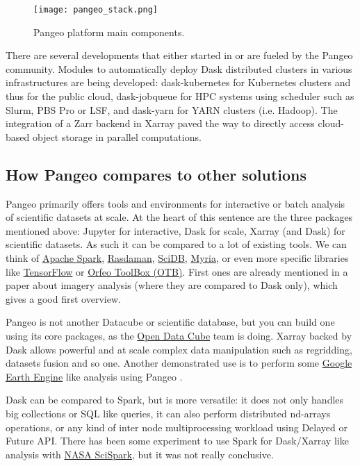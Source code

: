 \documentclass{article}
\begin{document}
\begin{figure}
  \centering
  \texttt{[image: pangeo\_stack.png]}
  \caption{\label{pangeo_stack} Pangeo platform main components.}
\end{figure}

There are several developments that either started in or are fueled by the
Pangeo community. Modules to automatically deploy Dask distributed clusters in various infrastructures are being developed: dask-kubernetes for Kubernetes clusters and thus for the public cloud, dask-jobqueue\cite{b4} for HPC systems using scheduler such as Slurm, PBS Pro or LSF, and dask-yarn for YARN clusters (i.e. Hadoop).
The integration of a Zarr backend in Xarray paved the way to directly access cloud-based object storage in parallel computations.


\subsection{How Pangeo compares to other solutions}
\label{ssec:pangeoadvantages}

Pangeo primarily offers tools and environments for interactive or batch analysis of scientific datasets at scale. 
At the heart of this sentence are the three packages mentioned above: 
Jupyter for interactive, Dask for scale, Xarray (and Dask) for scientific 
datasets.
As such it can be compared to a lot of existing tools. We can think of 
\href{https://spark.apache.org/}{Apache Spark}, \href{http://www.rasdaman.com/}{Rasdaman}, 
\href{https://www.paradigm4.com/try_scidb/}{SciDB}, \href{http://myria.cs.washington.edu/}{Myria},
or even more specific libraries like \href{https://www.tensorflow.org/}{TensorFlow} or 
\href{https://www.orfeo-toolbox.org/}{Orfeo ToolBox (OTB)}. First ones are
already mentioned in a paper about imagery analysis \cite{b4_2} (where they
are compared to Dask only), which gives a good first overview.

Pangeo is not another Datacube or scientific database, but you can
build one using its core packages, as the 
\href{https://www.opendatacube.org}{Open Data Cube} team is doing. Xarray
backed by Dask allows powerful and at scale complex data manipulation such as
regridding, datasets fusion and so one. Another demonstrated use is to perform some 
\href{https://earthengine.google.com/}{Google Earth Engine} like
analysis using Pangeo \cite{b6}.

Dask can be compared to Spark, but is more versatile: it does not only
handles big collections or SQL like queries, it can also perform distributed
nd-arrays operations, or any kind of inter node multiprocessing workload using
Delayed or Future API. There has been some experiment to use Spark for Dask/Xarray like analysis with
\href{https://scispark.jpl.nasa.gov/}{NASA SciSpark}, but it was not really
conclusive.
\end{document}
